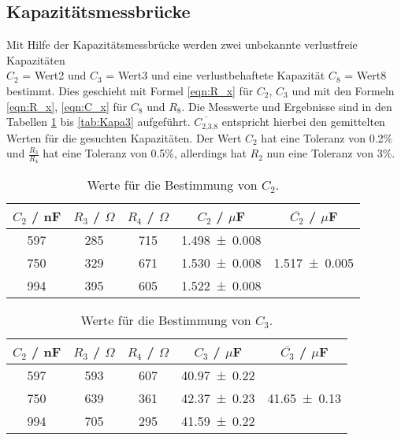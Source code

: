 \subsection{Kapazitätsmessbrücke}
Mit Hilfe der Kapazitätsmessbrücke werden zwei unbekannte verlustfreie Kapazitäten \\ $C_2$ = Wert2 und $C_3$ = Wert3 und eine verlustbehaftete Kapazität $C_8$ = Wert8 bestimmt. Dies geschieht mit Formel \ref{eqn:R_x} für $C_2$, $C_3$ und mit den Formeln \ref{eqn:R_x}, \ref{eqn:C_x} für $C_8$ und $R_8$. Die Messwerte und Ergebnisse sind in den Tabellen \ref{tab:Kapa1} bis \ref{tab:Kapa3} aufgeführt. $\overline{C_\text{2,3,8}}$ entspricht hierbei den gemittelten Werten für die gesuchten Kapazitäten.
Der Wert $C_2$ hat eine Toleranz von 0.2\% und $\frac{R_3}{R_4}$ hat eine Toleranz von 0.5\%, allerdings hat $R_2$ nun eine Toleranz von 3\%.

\begin{table}[H] %
  \centering
  \begin{tabular}{c c c c c}
    \toprule
    $C_2$ / nF & $R_3$ / $\Omega$ & $R_4$ / $\Omega$ & $C_2$ / $\mu$F & $\overline{C_2}$ / $\mu$F \\
    \midrule
    597 & 285 & 715 & \num{1.498 +- 0.008} &  \\
    750 & 329 & 671 & \num{1.530 +- 0.008} &  \num{1.517 +- 0.005}  \\
    994 & 395 & 605 & \num{1.522 +- 0.008} &  \\
  \end{tabular}
  \caption{Werte für die Bestimmung von $C_2$.}
  \label{tab:Kapa1}
\end{table}

\begin{table}[H] %
  \centering
  \begin{tabular}{c c c c c}
    \toprule
    $C_2$ / nF & $R_3$ / $\Omega$ & $R_4$ / $\Omega$ & $C_3$ / $\mu$F & $\overline{C_3}$ / $\mu$F \\
    \midrule
    597 & 593 & 607 & \num{40.97 +- 0.22} &  \\
    750 & 639 & 361 & \num{42.37 +- 0.23} &  \num{41.65 +- 0.13}  \\
    994 & 705 & 295 & \num{41.59 +- 0.22} &  \\
  \end{tabular}
  \caption{Werte für die Bestimmung von $C_3$.}
  \label{tab:Kapa2}
\end{table}


